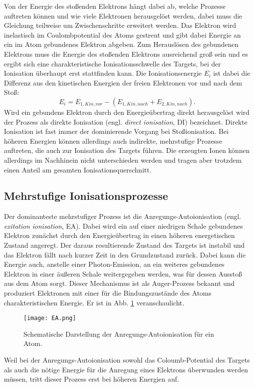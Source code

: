 Von der Energie des stoßenden Elektrons hängt dabei ab, welche Prozesse auftreten können und wie viele Elektronen herausgelöst werden, dabei muss die Gleichung teilweise um Zwischenschritte erweitert werden. Das Elektron wird inelastisch im Coulombpotential des Atoms gestreut und gibt dabei Energie an ein im Atom gebundenes Elektron abgeben. Zum Herauslösen des gebundenen Elektrons muss die Energie des stoßenden Elektrons ausreichend groß sein und es ergibt sich eine charakteristische Ionisationsschwelle des Targets, bei der Ionisation überhaupt erst stattfinden kann. Die Ionisationsenergie $E_i$ ist dabei die Differenz aus den kinetischen Energien der freien Elektronen vor und nach dem Stoß: 
\begin{equation}
    E_i = E_{1,Kin, vor} - (E_{1,Kin, nach} + E_{2,Kin, nach}).
\end{equation} 
Wird ein gebundens Elektron durch den Energieübertrag direkt herausgelöst wird der Prozess als direkte Ionisation (engl. \textit{direct ionisation}, DI) bezeichnet. Direkte Ionisation ist fast immer der dominierende Vorgang bei Stoßionisation. Bei höheren Energien können allerdings auch indirekte, mehrstufige Prozesse auftreten, die auch zur Ionisation des Targets führen. Die erzeugten Ionen können allerdings im Nachhinein nicht unterschieden werden und tragen aber trotzdem einen Anteil am gesamten Ionisationsquerschnitt.

\subsection{Mehrstufige Ionisationsprozesse}
Der dominanteste mehrstufiger Prozess ist die Anregungs-Autoionisation (engl. \textit{exitation ionisation}, EA). Dabei wird ein auf einer niedrigen Schale gebundenes Elektron zunächst durch den Energieübertrag in einen höheren energetischen Zustand angeregt. Der daraus resultierende Zustand des Targets ist instabil und das Elektron fällt nach kurzer Zeit in den Grundzustand zurück. Dabei kann die Energie auch, anstelle einer Photon-Emission, an ein weiteres gebundenes Elektron in einer äußeren Schale weitergegeben werden, was für dessen Ausstoß aus dem Atom sorgt. Dieser Mechanismus ist als Auger-Prozess bekannt und produziert Elektronen mit einer für die Bindungszustände des Atoms charakteristischen Energie. Er ist in Abb. \ref{fig:EA} veranschaulicht.
\begin{figure}[h]
    \centering
    \texttt{[image: EA.png]}
    \caption{Schematische Darstellung der Anregungs-Autoionisation für ein Atom.}
    \label{fig:EA}
\end{figure}
Weil bei der Anregungs-Autoionisation sowohl das Coloumb-Potential des Targets als auch die nötige Energie für die Anregung eines Elektrons überwunden werden müssen, tritt dieser Prozess erst bei höheren Energien auf. 

